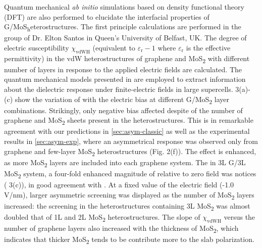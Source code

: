 Quantum mechanical \textit{ab initio} simulations based on
density functional theory (DFT) are also performed to elucidate the interfacial properties of G/MoS\textsubscript
heterostructures.
The first principle calculations are performed in the group of Dr. Elton Santos in Queen's University of Belfast, UK.
%
The degree of electric susceptibility $\chi_{\mathrm{vdWH}}$ (equivalent to
$\varepsilon_{\mathrm{r}} - 1$ where $\varepsilon_{\mathrm{r}}$ is the
effective permittivity) in the vdW heterostructures of graphene and
MoS\textsubscript{2} with different number of layers in response to
the applied electric fields are calculated.
%
The quantum mechanical models presented in
\cite{Santos_2013_tunable_eps_gr,Santos_2013_ACSnano_kaxi} are
employed to extract information about the dielectric response under
finite-electric fields in large supercells.
%
%
 3(a)-(c) show the variation of with the electric
bias at different G/MoS\textsubscript{2} layer combinations.
%
Strikingly, only negative bias
affected despite of the number of graphene and MoS\textsubscript{2}
sheets present in the heterostructures. This is in remarkable
agreement with our predictions in \autoref{sec:asym-classic} as well as the experimental results in \autoref{sec:asym-exp}, where an asymmetrical response
was observed only from graphene and few-layer MoS\textsubscript{2}
heterostructures (Fig. 2(f)).
%
The effect is enhanced, as more
MoS\textsubscript{2} layers are included into each graphene
system. The in 3L G/3L MoS\textsubscript{2}
system, a four-fold enhanced magnitude of relative to zero
field was notices ( 3(c)), in good agreement with .
%
At a fixed value of the electric field (-1.0 V/nm), larger asymmetric
screening was displayed as the number of MoS\textsubscript{2} layers
increased: the screening in the heterostructures containing 3L
MoS\textsubscript{2} was almost doubled that of 1L and 2L
MoS\textsubscript{2} heterostructures.
%
The slope of $\chi_{\mathrm{vdWH}}$ versus the number of graphene
layers also increased with the thickness of MoS\textsubscript{2},
which indicates that thicker MoS\textsubscript{2} tends to be
contribute more to the slab polarization.
%
